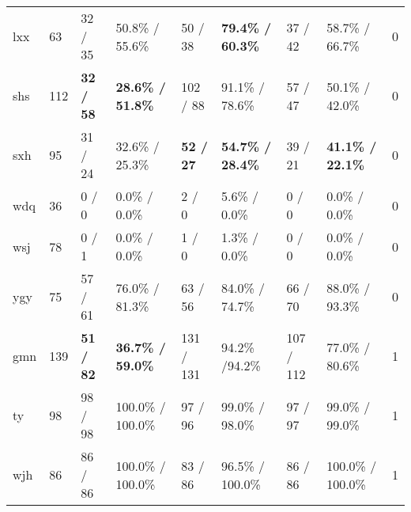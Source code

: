 \begin{landscape}
\begin{longtable}{m{2cm}<{\centering}m{2cm}<{\centering}m{2cm}<{\centering}m{2cm}<{\centering}m{2cm}<{\centering}m{2cm}<{\centering}m{2cm}<{\centering}m{2cm}<{\centering}m{2cm}<{\centering}}
            lxx                   & 63                    & 32 / 35         & 50.8\% / 55.6\%    & 50 / 38         & \textbf{79.4\% / 60.3\%}     & 37 / 42         & 58.7\% / 66.7\%     & 0                                                                      \\
            shs                   & 112                   & \textbf{32 / 58}         & \textbf{28.6\% / 51.8\%}     & 102 / 88        & 91.1\% / 78.6\%     & 57 / 47         & 50.1\% / 42.0\%      & 0                                                                      \\
            sxh                   & 95                    & 31 / 24         & 32.6\% / 25.3\%     & \textbf{52 / 27}         & \textbf{54.7\% / 28.4\%}     & 39 / 21         & \textbf{41.1\% / 22.1\%}      & 0                                                                      \\
            wdq                   & 36                    & 0 / 0          & 0.0\% / 0.0\%      & 2 / 0          & 5.6\% / 0.0\%      & 0 / 0          & 0.0\% / 0.0\%      & 0                                                                      \\
            wsj                   & 78                    & 0 / 1          & 0.0\% / 0.0\%      & 1 / 0          & 1.3\% / 0.0\%     & 0 / 0          & 0.0\% / 0.0\%     & 0                                                                      \\
            ygy                   & 75                    & 57 / 61         & 76.0\% / 81.3\%     & 63 / 56         & 84.0\% / 74.7\%    & 66 / 70         & 88.0\% / 93.3\%     & 0                                                                      \\
            gmn                   & 139                   & \textbf{51 / 82}        & \textbf{36.7\% / 59.0\%}     & 131 / 131        & 94.2\% /94.2\%    & 107 / 112        & 77.0\% / 80.6\%      & 1                                                                      \\
            ty                    & 98                    & 98 / 98         & 100.0\% / 100.0\%     & 97 / 96         & 99.0\% / 98.0\%     & 97 / 97         & 99.0\% / 99.0\%      & 1                                                                      \\
            wjh                   & 86                    & 86 / 86         & 100.0\% / 100.0\%    & 83 / 86         & 96.5\% / 100.0\%    & 86 / 86         & 100.0\% / 100.0\%    & 1                                                                      \\

\end{longtable}
\end{landscape}
